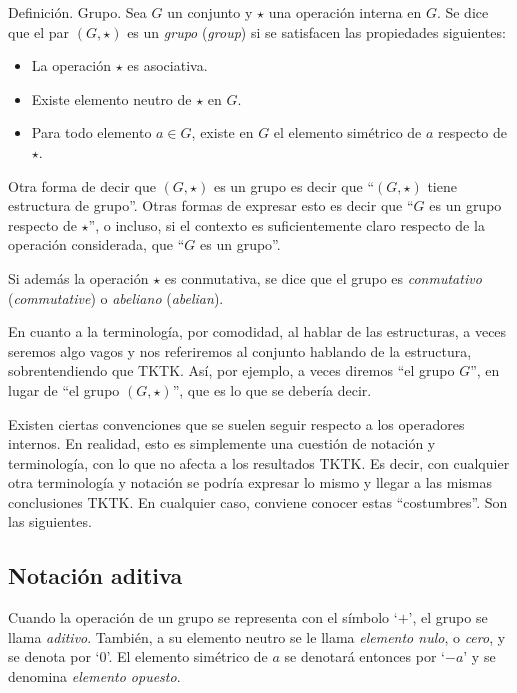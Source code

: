 




Definición. Grupo. Sea $G$ un conjunto y $\star$ una operación interna en
$G$. Se dice que el par $(G, \star)$ es un \emph{grupo} (\emph{group}) si se
satisfacen las propiedades siguientes:

\begin{itemize}
  \item La operación $\star$ es asociativa.
  \item Existe elemento neutro de $\star$ en $G$.
  \item Para todo elemento $a \in G$, existe en $G$ el elemento simétrico de
    $a$ respecto de $\star$.
\end{itemize}

Otra forma de decir que $(G, \star)$ es un grupo es decir que ``$(G, \star)$
tiene estructura de grupo''. Otras formas de expresar esto es decir que
``$G$ es un grupo respecto de $\star$'', o incluso, si el contexto es
suficientemente claro respecto de la operación considerada, que ``$G$ es un
grupo''.

Si además la operación $\star$ es conmutativa, se dice que el grupo es
\emph{conmutativo} (\emph{commutative}) o \emph{abeliano} (\emph{abelian}).

En cuanto a la terminología, por comodidad, al hablar de las estructuras, a
veces seremos algo vagos y nos referiremos al conjunto hablando de la
estructura, sobrentendiendo que TKTK. Así, por ejemplo, a veces diremos ``el
grupo $G$'', en lugar de ``el grupo $(G, \star)$'', que es lo que se debería
decir.

Existen ciertas convenciones que se suelen seguir respecto a los operadores
internos. En realidad, esto es simplemente una cuestión de notación y
terminología, con lo que no afecta a los resultados TKTK. Es decir, con
cualquier otra terminología y notación se podría expresar lo mismo y llegar
a las mismas conclusiones TKTK. En cualquier caso, conviene conocer estas
``costumbres''. Son las siguientes.




\subsection{Notación aditiva}

Cuando la operación de un grupo se representa con el símbolo `$+$', el grupo
se llama \emph{aditivo}. También, a su elemento neutro se le llama
\emph{elemento nulo}, o \emph{cero}, y se denota por `$0$'. El elemento
simétrico de $a$ se denotará entonces por `${-a}$' y se denomina
\emph{elemento opuesto}.

